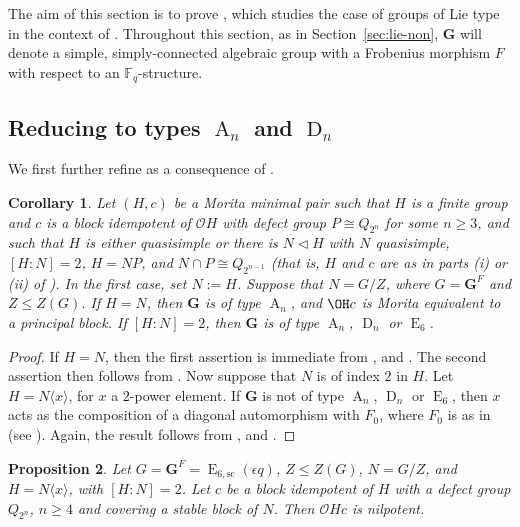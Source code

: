 \documentclass{amsart}
\theoremstyle{plain}\newtheorem{Theorem}{Theorem}[section]
\theoremstyle{plain}\newtheorem{Conjecture}[Theorem]{Conjecture}
\theoremstyle{plain}\newtheorem{Corollary}[Theorem]{Corollary}
\theoremstyle{plain}\newtheorem{Lemma}[Theorem]{Lemma}
\theoremstyle{plain}\newtheorem{Proposition}[Theorem]{Proposition}
\theoremstyle{definition}\newtheorem{Definition}[Theorem]{Definition}
\theoremstyle{definition}\newtheorem{Example}[Theorem]{Example}
\theoremstyle{definition}\newtheorem{Examples}[Theorem]{Examples}
\theoremstyle{definition}\newtheorem{Exercise}[Theorem]{Exercise}
\theoremstyle{definition}\newtheorem{Notation}[Theorem]{Notation}
\theoremstyle{definition}\newtheorem{Remark}[Theorem]{Remark}
\theoremstyle{definition}\newtheorem{Remarks}[Theorem]{Remarks}
\def\CO{{\mathcal{O}}}    \def\OPE{{\mathcal{O}(P\rtimes E)}}
\newcommand{\bG}{{\mathbf{G}}}
\newcommand{\type}{\operatorname}
\numberwithin{equation}{section}
\begin{document}
The  aim of this section is to prove , which studies the case of  groups of Lie type in the context of .  Throughout this section,  as in Section~\ref {sec:lie-non}, $\bG$ will denote a  simple, simply-connected algebraic group with a Frobenius morphism $F$  with respect to an ${\mathbb F}_q$-structure.

\subsection{Reducing to types $\type{A}_n$ and $\type{D}_n$}
We first further refine  as a consequence of .
 \begin{Corollary}   Let $(H,c)$ be a Morita minimal pair such that $H$ is a finite group and $c$ is a block idempotent of $\CO  H$ with defect group $P \cong Q_{2^n}$ for some $n \geq 3$, and such that $H$ is either quasisimple or there is $N\lhd H$ with $N$ quasisimple, $[H:N]=2$, $H=NP$, and $N\cap P\cong Q_{2^{n-1}}$ (that is, $H$ and  $c$ are as in parts (i) or (ii)  of 
). In the first case,  set  $ N:=H$.  Suppose that  $N= G/Z$, where $G=\bG^F$  and $Z \leq  Z(G)$.
If $H=N$,  then  $\bG$ is of type $\type{A}_n$, and  $\OH c $ is Morita equivalent to a principal block.  If   $ [H:N]=2 $,  then  $\bG$ is  of type $\type{A}_n$, $\type{D}_n$ or $\type{E}_6$.
\end{Corollary}
\begin{proof} If  $H=N$, then  the first  assertion  is immediate from  ,   and . The second assertion then follows from  .
Now suppose that    $N$ is of index $2$ in $H$. Let  $H=N \langle  x \rangle $,  for  $x$ a  $2$-power element.   If $\bG$ is  not of type  $\type{A}_n$, $\type{D}_n$ or $\type{E}_6$,  then  $x$  acts   as the composition  of a diagonal automorphism  with $F_0$, where  $F_0$ is as in  (see \cite[Thms.~2.5.1,~2.5.12]{GLS3}).  Again, the result follows  from ,   and .
 \end{proof}


\begin{Proposition}   Let $G= \bG^F =  \type{E}_{6,\mathrm{sc}}(\epsilon q) $,   $Z \leq  Z(G)$, $ N= G/Z$, and  $H=N\langle x\rangle$, with   $[H:N]=2$.  
Let $c$  be a  block  idempotent  of    $H$ with  a  defect group $Q_{2^n} $, $ n\geq 4 $  and  covering a  stable block of $N$. Then $\CO Hc$ is nilpotent.
\end{Proposition}
\end{document}
